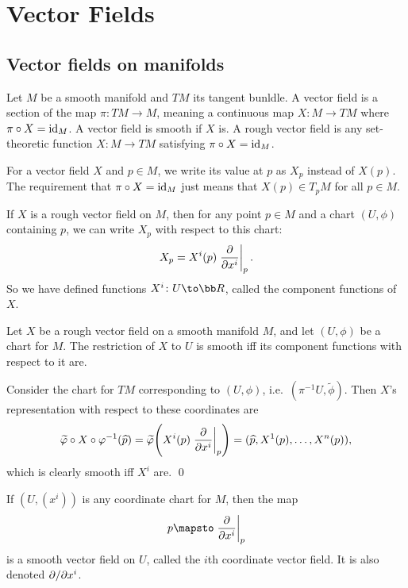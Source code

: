 \section{Vector Fields}

\subsection{Vector fields on manifolds}

\bdefn

    Let $M$ be a smooth manifold and $TM$ its tangent bunldle.
    A {\emphcolor vector field} is a section of the map $\pi\colon TM\to M$, meaning a continuous map $X\colon M\to TM$ where $\pi\circ X={\rm id}_M$.
    A vector field is {\emphcolor smooth} if $X$ is.
    A {\emphcolor rough vector field} is any set-theoretic function $X\colon M\to TM$ satisfying $\pi\circ X={\rm id}_M$.

\edefn

For a vector field $X$ and $p\in M$, we write its value at $p$ as $X_p$ instead of $X(p)$.
The requirement that $\pi\circ X={\rm id}_M$ just means that $X(p)\in T_pM$ for all $p\in M$.

If $X$ is a rough vector field on $M$, then for any point $p\in M$ and a chart $(U,\phi)$ containing $p$, we can write $X_p$ with respect to
this chart:
$$ X_p = X^i(p)\left.{{\partial }\over{\partial x^i}}\right|_p . $$
So we have defined functions $X^i\colon U\to\bR$, called the {\emphcolor component functions} of $X$.

\bprop

    Let $X$ be a rough vector field on a smooth manifold $M$, and let $(U,\phi)$ be a chart for $M$.
    The restriction of $X$ to $U$ is smooth iff its component functions with respect to it are.

\eprop

\bproof

    Consider the chart for $TM$ corresponding to $(U,\phi)$, i.e.\ $(\pi^{-1}U,\tilde\phi)$.
    Then $X$'s representation with respect to these coordinates are
    $$ \widetilde{\varphi}\circ X\circ\varphi^{-1}(\widehat p) = \widetilde{\varphi}\mathopen{}\mathclose{\left(X^i(p)\left.{{\partial }\over{\partial x^i}}\right|_p\right)} = (\widehat p,X^1(p),\dots,X^n(p)) , $$
    which is clearly smooth iff $X^i$ are.
    \qed

\eproof

\bexam

    If $(U,(x^i))$ is any coordinate chart for $M$, then the map
    $$ p\mapsto\evpdv{x^i}_p $$
    is a smooth vector field on $U$, called the $i$th {\emphcolor coordinate vector field}.
    It is also denoted $\partial /\partial x^i$.

